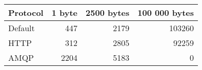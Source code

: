 \begin{tabular}{lrrr}
\hline
 Protocol   &   1 byte &   2500 bytes &   100 000 bytes \\
\hline
 Default    &      447 &         2179 &          103260 \\
 HTTP       &      312 &         2805 &           92259 \\
 AMQP       &     2204 &         5183 &               0 \\
\hline
\end{tabular}